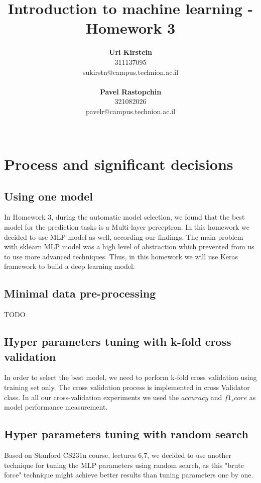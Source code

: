 \documentclass[12pt]{article}
\begin{document}
\title{\Huge Introduction to machine learning - Homework 3}

\author{
  \textbf{Uri Kirstein}\\
  311137095 \\ sukirstn@campus.technion.ac.il
  \\ \\
  \textbf{Pavel Rastopchin}\\
  321082026 \\ pavelr@campus.technion.ac.il
  \\ \\ 
}

\maketitle


\section{Process and significant decisions}
\subsection{Using one model}
In Homework 3, during the automatic model selection, we found that the best model for the prediction tasks is a Multi-layer perceptron. In this homework we decided to use MLP model as well, according our findings. The main problem with sklearn MLP model was a high level of abstraction which prevented from us to use more advanced techniques. Thus, in this homework we will use Keras framework to build a deep learning model.   

\subsection{Minimal data pre-processing}
TODO

\subsection{Hyper parameters tuning with k-fold cross validation}
In order to select the best model, we need to perform k-fold cross validation using training set only. The cross validation process is implemented in cross Validator class. In all our cross-validation experiments we used the $accuracy$ and $f1_score$ as model performance measurement.

\subsection{Hyper parameters tuning with random search}
Based on Stanford CS231n course, lectures 6,7, we decided to use another technique for tuning the MLP parameters using random search, as this "brute force" technique might achieve better results than tuning parameters one by one.
\end{document}
